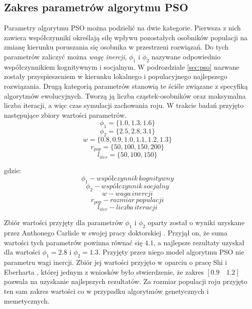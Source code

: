 \subsection{Zakres parametrów algorytmu PSO}
\par
Parametry algorytmu PSO można podzielić na dwie kategorie. Pierwsza z nich zawiera współczynniki określają siłę wpływu pozostałych osobników populacji na zmianę kierunku poruszania się osobnika w przestrzeni rozwiązań. Do tych parametrów zaliczyć można \emph{wagę inercji}, $\phi_1$ i $\phi_2$ nazywane odpowiednio współczynnikiem kognitywnym i socjalnym. W podrozdziale \ref{sec:pso} nazwane zostały przyspieszeniem w kierunku lokalnego i populacyjnego najlepszego rozwiązania. Drugą kategorią parametrów stanowią te ściśle związane z specyfiką algorytmów ewolucyjnych. Tworzą ją liczba cząstek-osobników oraz maksymalna liczba iteracji, a więc czas symulacji zachowania roju. W trakcie badań przyjęto następujące zbiory wartości parametrów.
\[\phi_1 = \lbrace1.0, 1.3, 1.6 \rbrace\]
\[\phi_2 = \lbrace2.5, 2.8, 3.1\rbrace\]
\[w = \lbrace0.8, 0.9, 1.0, 1.1, 1.2, 1.3\rbrace\]
\[r_{pop} = \lbrace50, 100, 150, 200\rbrace\]
\[l_{iter}=\lbrace50, 100, 150\rbrace\]

gdzie:
\[\phi_1 - współczynnik\, kognitywny\]
\[\phi_2 - współczynnik\, socjalny\]
\[w - waga\, inercji\]
\[r_{pop} - rozmiar\, populacji\]
\[l_{iter} - liczba\, iteracji\]
\par
Zbiór wartości przyjęty dla parametrów $\phi_1$ i $\phi_2$ oparty został o wyniki uzyskane przez Anthonego Carlisle w swojej pracy doktorskiej \cite{carlisle2002applying}. Przyjął on, że suma wartości tych parametrów powinna równać się $4.1$, a najlepsze rezultaty uzyskał dla wartości $\phi_1=2.8$ i $\phi_2=1.3$. Przyjęty przez niego model algorytmu PSO nie parametru wagi inercji. Zbiór jej wartości przyjęto w oparciu o pracę Shi i Eberharta \cite{shi1998modified}, której jednym z wniosków było stwierdzenie, że zakres $[0.9\quad1.2]$ pozwala na uzyskanie najlepszych rezultatów. Za rozmiar populacji roju przyjęto ten sam zakres wartości co w przypadku algorytmów genetycznych i memetycznych.


